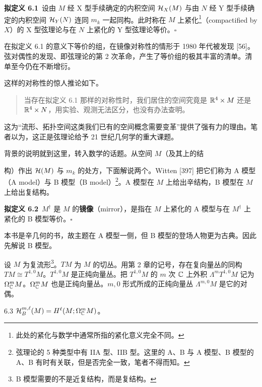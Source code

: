 \par\medskip\noindent\textbf{拟定义 6.1}\ 设由 $M$ 经 X 型手续确定的内积空间 $\mathcal{H}_X(M)$ 与由 $N$ 经 Y 型手续确定的内积空间 $\mathcal{H}_Y(N)$ 连同 $m_k$ 一起同构。此时称在 $M$ 上紧化\footnote{此处的紧化与数学中通常所指的紧化意义完全不同。}（compactified by $X$）的 X 型弦理论与在 $N$ 上紧化的 Y 型弦理论等价。\hfill$\square$\par\medskip

在拟定义 6.1 的意义下等价的组，在镜像对称性的情形于 1980 年代被发现 [56]。弦对偶性的发现、即弦理论的第 2 次革命，产生了等价组的极其丰富的清单。清单至今仍在不断增衍。

这样的对称性的惊人推论如下。
\begin{quote}
  当存在拟定义 6.1 那样的对称性时，我们居住的空间究竟是 $\mathbb{R}^4\times M$ 还是 $\mathbb{R}^4\times N$，用实验、观测无法区分，也没有办法查明。
\end{quote}

这为“流形、拓扑空间这类我们已有的空间概念需要变革”提供了强有力的理由。笔者以为，这正是弦理论给予 21 世纪几何学的重大课题。

背景的说明就到这里，转入数学的话题。从空间 $M$（及其上的结

构）作出 $\mathcal{H}(M)$ 与 $m_k$ 的处方，下面解说两个。Witten [397] 把它们称为 A 模型（A model）与 B 模型（B model）\footnote{弦理论的 5 种类型中有 IIA 型、IIB 型。这里的 A、B 与 A 模型、B 模型的 A、B 有时有关联，但是否完全一致，笔者不得而知。}。A 模型在 $M$ 上给出辛结构，B 模型在 $M$ 上给出复结构。

\par\medskip\noindent\textbf{拟定义 6.2}\ $M^\dagger$ 是 $M$ 的\textbf{镜像}（mirror），是指在 $M$ 上紧化的 A 模型与在 $M^\dagger$ 上紧化的 B 模型等价。\hfill$\square$\par\medskip

本书是辛几何的书，故主题在 A 模型一侧，但 B 模型的登场人物更为古典。因此先解说 B 模型。

设 $M$ 为复流形\footnote{B 模型需要的不是近复结构，而是复结构。}。$TM$ 为 $M$ 的切丛。用第 2 章的记号，存在复向量丛的同构 $TM\cong T^{1,0}M$。$T^{1,0}M$ 是正纯向量丛。把 $T^{1,0}M$ 的 $m$ 次 $\mathbb{C}$ 上外积 $\Lambda^mT^{1,0}M$ 记为 $\Omega^m_{\mathbb{C}} M$。$\Omega^m_{\mathbb{C}} M$ 也是正纯向量丛。$m,0$ 形式所成的正纯向量丛 $\Lambda^{m,0}M$ 是它的对偶。

\begin{definition}{6.3}
  $\mathcal{H}_B^{m,\ell}(M)=H^\ell(M;\Omega^m_{\mathbb{C}} M)$。
\end{definition}

